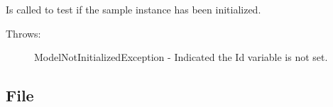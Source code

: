 \documentclass[letterpaper,10pt,english]{sphinxmanual}
\begin{document}
\begin{fulllineitems}
\begin{fulllineitems}
\begin{quote}
\begin{description}
\begin{itemize}
\end{itemize}

\end{description}\end{quote}

\end{fulllineitems}


\begin{fulllineitems}
\label{Available modules:BaseSpacePy.model.Sample.Sample.isInit}
Is called to test if the sample instance has been initialized.
\begin{description}
\item[{Throws:}] \leavevmode
ModelNotInitializedException - Indicated the Id variable is not set.

\end{description}

\end{fulllineitems}


\end{fulllineitems}



\subsection{File}
\label{Available modules:file}
\end{document}
